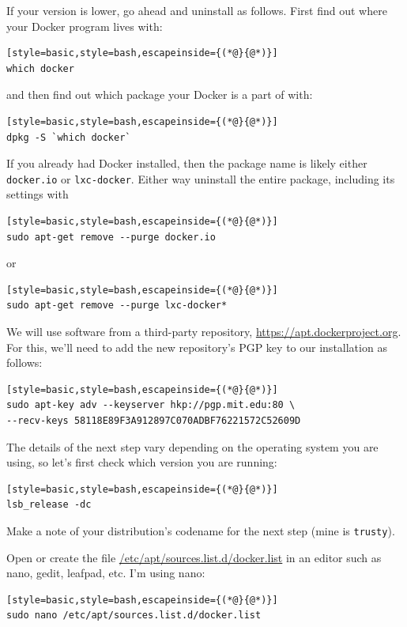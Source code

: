 \documentclass[12pt, a4paper, twoside,openany,titlepage]{article}
\begin{document}
{If your version is lower, go ahead and uninstall as follows. First find out where your Docker program lives with:
\begin{lstlisting}[style=basic,style=bash,escapeinside={(*@}{@*)}]
which docker
\end{lstlisting}

and then find out which package your Docker is a part of with:
\begin{lstlisting}[style=basic,style=bash,escapeinside={(*@}{@*)}]
dpkg -S `which docker`
\end{lstlisting}

If you already had Docker installed, then the package name is likely either \texttt{docker.io} or \texttt{lxc-docker}. Either way uninstall the entire package, including its settings with
\begin{lstlisting}[style=basic,style=bash,escapeinside={(*@}{@*)}]
sudo apt-get remove --purge docker.io
\end{lstlisting}
or
\begin{lstlisting}[style=basic,style=bash,escapeinside={(*@}{@*)}]
sudo apt-get remove --purge lxc-docker*
\end{lstlisting}

We will use software from a third-party repository, \url{https://apt.dockerproject.org}. For this, we'll need to add the new repository's PGP key to our installation as follows:
\begin{lstlisting}[style=basic,style=bash,escapeinside={(*@}{@*)}]
sudo apt-key adv --keyserver hkp://pgp.mit.edu:80 \
--recv-keys 58118E89F3A912897C070ADBF76221572C52609D
\end{lstlisting}

The details of the next step vary depending on the operating system you are using, so let's first check which version you are running:
\begin{lstlisting}[style=basic,style=bash,escapeinside={(*@}{@*)}]
lsb_release -dc
\end{lstlisting}
Make a note of your distribution's codename for the next step (mine is \texttt{trusty}).

Open or create the file \url{/etc/apt/sources.list.d/docker.list} in an editor such as nano, gedit, leafpad, etc. I'm using nano:
\begin{lstlisting}[style=basic,style=bash,escapeinside={(*@}{@*)}]
sudo nano /etc/apt/sources.list.d/docker.list
\end{lstlisting}

}
\end{document}
